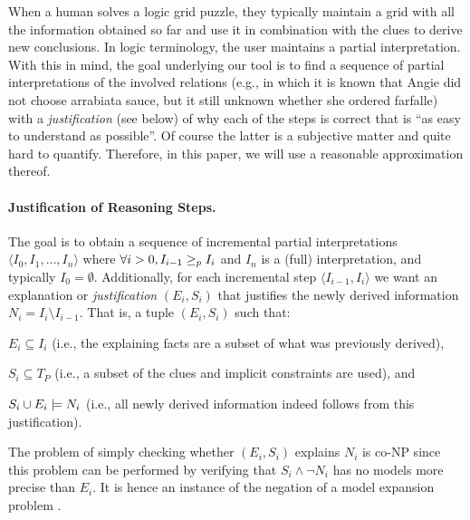 
When a human solves a logic grid puzzle, they typically maintain a grid with all the information obtained so far and use it in combination with the clues to derive new conclusions. In logic terminology, the user maintains a partial interpretation.  
With this in mind, the goal underlying our tool is to find a sequence of partial interpretations of the involved relations (e.g., in which it is known that Angie did not choose arrabiata sauce, but it still unknown whether she ordered farfalle) with a 
\emph{justification} (see below) of why each of the steps is correct that is ``as easy to understand as possible''. 
Of course the latter is a subjective matter and quite hard to quantify. Therefore, in this paper, we will use a reasonable approximation thereof. 


\paragraph{Justification of Reasoning Steps.}
The goal is to obtain a sequence of incremental partial interpretations $\langle I_0, I_1, \ldots, I_n \rangle$ where $\forall i>0, I_{i-1} \geq_p I_{i}$ and $I_n$ is a (full) interpretation, and typically $I_0 = \emptyset$.
Additionally, for each incremental step $\langle I_{i-1}, I_i \rangle$ we want an explanation or \textit{justification} $(E_i,S_i)$ that justifies the newly derived information $N_i = I_i \setminus I_{i-1}$. That is, a tuple $(E_i,S_i)$ such that: 
\begin{compactitem}
	\item $E_i\subseteq I_i$ (i.e., the explaining facts are a subset of what was previously derived),
	\item $S_i \subseteq T_P$ (i.e., a subset of the clues and implicit constraints are used), and 
	\item $S_i \cup E_i \models N_i$ (i.e., all newly derived information indeed follows from this justification).
\end{compactitem}

The problem of simply checking whether $(E_i,S_i)$ explains $N_i$ is co-NP since this problem can be performed by verifying that $S_i \land \lnot N_i$ has no models more precise than $E_i$. It is hence an instance of the negation of a model expansion problem \cite{ternovskaMXcomplexity}.

